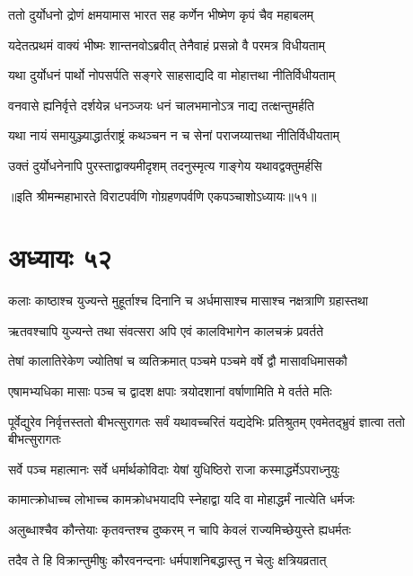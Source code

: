 \twolineshloka
{ततो दुर्योधनो द्रोणं क्षमयामास भारत}
{सह कर्णेन भीष्मेण कृपं चैव महाबलम्}




\twolineshloka
{यदेतत्प्रथमं वाक्यं भीष्मः शान्तनवोऽब्रवीत्}
{तेनैवाहं प्रसन्नो वै परमत्र विधीयताम्}


\twolineshloka
{यथा दुर्योधनं पार्थो नोपसर्पति सङ्गरे}
{साहसाद्यदि वा मोहात्तथा नीतिर्विधीयताम्}


\twolineshloka
{वनवासे ह्यनिर्वृत्ते दर्शयेन्न धनञ्जयः}
{धनं चालभमानोऽत्र नाद्य तत्क्षन्तुमर्हति}


\twolineshloka
{यथा नायं समायुञ्ज्याद्धार्तराष्ट्रं कथञ्चन}
{न च सेनां पराजय्यात्तथा नीतिर्विधीयताम्}


\twolineshloka
{उक्तं दुर्योधनेनापि पुरस्ताद्वाक्यमीदृशम्}
{तदनुस्मृत्य गाङ्गेय यथावद्वक्तुमर्हसि}

॥इति श्रीमन्महाभारते विराटपर्वणि गोग्रहणपर्वणि एकपञ्चाशोऽध्यायः॥५१॥

\chapter{अध्यायः ५२}

\twolineshloka
{कलाः काष्ठाश्च युज्यन्ते मुहूर्ताश्च दिनानि च}
{अर्धमासाश्च मासाश्च नक्षत्राणि ग्रहास्तथा}


\twolineshloka
{ऋतवश्चापि युज्यन्ते तथा संवत्सरा अपि}
{एवं कालविभागेन कालचक्रं प्रवर्तते}


\twolineshloka
{तेषां कालातिरेकेण ज्योतिषां च व्यतिक्रमात्}
{पञ्चमे पञ्चमे वर्षे द्वौ मासावधिमासकौ}


\twolineshloka
{एषामभ्यधिका मासाः पञ्च च द्वादश क्षपाः}
{त्रयोदशानां वर्षाणामिति मे वर्तते मतिः}


\onelineshloka
{पूर्वेद्युरेव निर्वृत्तस्ततो बीभत्सुरागतः}
\twolineshloka
{सर्वं यथावच्चरितं यद्यदेभिः प्रतिश्रुतम्}
{एवमेतद्भ्रुवं ज्ञात्वा ततो बीभत्सुरागतः}


\twolineshloka
{सर्वे पञ्च महात्मानः सर्वे धर्मार्थकोविदाः}
{येषां युधिष्ठिरो राजा कस्माद्धर्मेऽपराध्नुयुः}


\twolineshloka
{कामात्क्रोधाच्च लोभाच्च कामक्रोधभयादपि}
{स्नेहाद्वा यदि वा मोहाद्धर्मं नात्येति धर्मजः}


\twolineshloka
{अलुब्धाश्चैव कौन्तेयाः कृतवन्तश्च दुष्करम्}
{न चापि केवलं राज्यमिच्छेयुस्ते ह्यधर्मतः}


\twolineshloka
{तदैव ते हि विक्रान्तुमीषुः कौरवनन्दनाः}
{धर्मपाशनिबद्धास्तु न चेलुः क्षत्रियव्रतात्}


